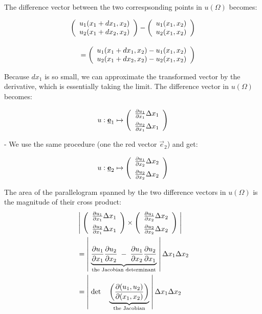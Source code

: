 The difference vector between the two correspsonding points in $u(\Omega)$ becomes:

\begin{equation*}
\begin{array}{r}
\left( \begin{array}{rrrrrrrrrrrrrrrrrrrrrrrrrr} 
u_1 (x_1 + dx_1, x_2)\\
u_2 (x_1 + dx_2, x_2)
\\ \end{array} \right) - 
\left( \begin{array}{rrrrrrrrrrrrrrrrrrrrrrrrrr} 
u_1 (x_1, x_2)\\
u_2 (x_1, x_2)
\\ \end{array} \right) \\[0.7cm]
=
\left( \begin{array}{rrrrrrrrrrrrrrrrrrrrrrrrrr} 
u_1 (x_1 + dx_1, x_2) - u_1 (x_1, x_2)\\
u_2 (x_1 + dx_2, x_2) - u_2 (x_1, x_2)
\\ \end{array} \right)
\end{array}
\end{equation*}

Because $dx_1$ is so small, we can approximate the transformed vector by the derivative, 
which is essentially taking the limit. The difference vector in $u(\Omega)$ becomes:

$$
u: \underline{\mathbf{e}}_1 \mapsto 
\left( \begin{array}{rrrrrrrrrrrrrrrrrrrrrrrrrr} 
\frac{\partial u_1}{\partial x_1} \Delta x_1\\[0.2cm]
\frac{\partial u_2}{\partial x_1} \Delta x_1
\\ \end{array} \right)
$$


- We use the same procedure (one the red vector $\vec e_2$) and get:

$$
u: \underline{\mathbf{e}}_2 \mapsto 
\left( \begin{array}{rrrrrrrrrrrrrrrrrrrrrrrrrr} 
\frac{\partial u_1}{\partial x_2} \Delta x_2\\[0.2cm]
\frac{\partial u_2}{\partial x_2} \Delta x_2
\\ \end{array} \right)
$$

The area of the parallelogram spanned by the two difference vectors in $u(\Omega)$ 
is the magnitude of their cross product:
\begin{align*}
&\left| \; 
\left( \begin{array}{rrrrrrrrrrrrrrrrrrrrrrrrrr} 
\frac{\partial u_1}{\partial x_1} \Delta x_1\\[0.2cm]
\frac{\partial u_2}{\partial x_1} \Delta x_1
\\ \end{array} \right)
\times
\left( \begin{array}{rrrrrrrrrrrrrrrrrrrrrrrrrr} 
\frac{\partial u_1}{\partial x_2} \Delta x_2\\[0.2cm]
\frac{\partial u_2}{\partial x_2} \Delta x_2
\\ \end{array} \right)
\; \right|\\ 
&=
\left| \; 
\underbrace{
\frac{\partial u_1}{\partial x_1} \frac{\partial u_2}{\partial x_2}
\; - \;
\frac{\partial u_1}{\partial x_2} \frac{\partial u_2}{\partial x_1}
}_{\text{the Jacobian determinant}}
\; \right| \Delta x_1 \Delta x_2 \\
&= 
\left| \; \det \quad
\underbrace{
\left(
\frac{\partial (u_1, u_2)}{\partial (x_1,x_2)}
\right)
}_{\text{the Jacobian}}
\; \right| \Delta x_1 \Delta x_2
\end{align*}

